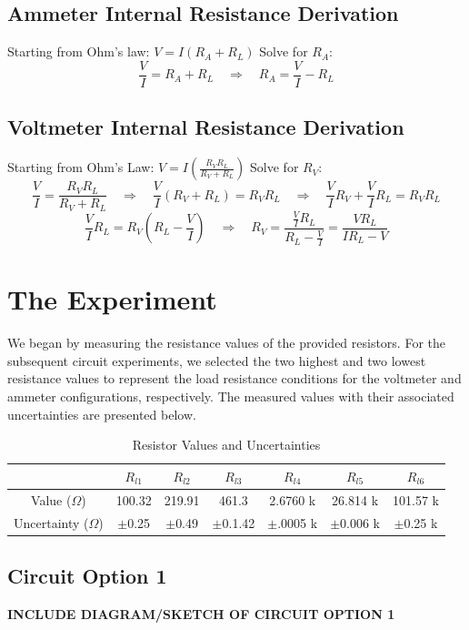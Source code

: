 \documentclass{article} %
\begin{document}
\subsection{Ammeter Internal Resistance Derivation}
Starting from Ohm's law: \( V = I(R_A + R_L) \)
Solve for \( R_A \):
\[
\frac{V}{I} = R_A + R_L \quad\Rightarrow\quad R_A = \frac{V}{I} - R_L
\]

\subsection{Voltmeter Internal Resistance Derivation}
Starting from Ohm's Law: \( V = I\left(\frac{R_V R_L}{R_V + R_L}\right) \)
Solve for \( R_V \):
\[
\frac{V}{I} = \frac{R_V R_L}{R_V + R_L} 
\quad\Rightarrow\quad \frac{V}{I}(R_V + R_L) = R_V R_L 
\quad\Rightarrow\quad \frac{V}{I}R_V + \frac{V}{I}R_L = R_V R_L
\]
\[
\frac{V}{I}R_L = R_V\left(R_L - \frac{V}{I}\right) 
\quad\Rightarrow\quad R_V = \frac{\frac{V}{I}R_L}{R_L - \frac{V}{I}} 
= \frac{V R_L}{I R_L - V}
\]
\section{The Experiment}

We began by measuring the resistance values of the provided resistors. 
For the subsequent circuit experiments, we selected the two highest and two lowest resistance values to represent the load resistance conditions for the voltmeter and ammeter configurations, respectively. 
The measured values with their associated uncertainties are presented below.

\label{table_resistor_values}
\begin{table}[htbp]
\centering
\caption{Resistor Values and Uncertainties}
\begin{tabular}{|c|c|c|c|c|c|c|}
\hline
 & $R_{l1}$ & $R_{l2}$ & $R_{l3}$ & $R_{l4}$ & $R_{l5}$ & $R_{l6}$ \\
\hline
Value ($\Omega$) & 100.32 & 219.91 & 461.3 & 2.6760 k & 26.814 k & 101.57 k \\
\hline
Uncertainty ($\Omega$) & $\pm$0.25 & $\pm$0.49 & $\pm$0.1.42 & $\pm$.0005 k & $\pm$0.006 k & $\pm$0.25 k \\
\hline
\end{tabular}
\end{table}

\newpage
\subsection{Circuit Option 1}
\textbf{INCLUDE DIAGRAM/SKETCH OF CIRCUIT OPTION 1}
\end{document}
